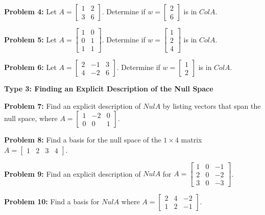 \documentclass[11pt]{article}
\begin{document}
\noindent \textbf{Problem 4:} Let $A = \begin{bmatrix} 1 & 2 \\ 3 & 6 \end{bmatrix}$. Determine if $w = \begin{bmatrix} 2 \\ 6 \end{bmatrix}$ is in $Col A$.

\noindent \textbf{Problem 5:} Let $A = \begin{bmatrix} 1 & 0 \\ 0 & 1 \\ 1 & 1 \end{bmatrix}$. Determine if $w = \begin{bmatrix} 1 \\ 2 \\ 4 \end{bmatrix}$ is in $Col A$.

\noindent \textbf{Problem 6:} Let $A = \begin{bmatrix} 2 & -1 & 3 \\ 4 & -2 & 6 \end{bmatrix}$. Determine if $w = \begin{bmatrix} 1 \\ 2 \end{bmatrix}$ is in $Col A$.

\vspace{0.5cm}
\noindent \textbf{Type 3: Finding an Explicit Description of the Null Space}

\noindent \textbf{Problem 7:} Find an explicit description of $Nul A$ by listing vectors that span the null space, where $A = \begin{bmatrix} 1 & -2 & 0 \\ 0 & 0 & 1 \end{bmatrix}$.

\noindent \textbf{Problem 8:} Find a basis for the null space of the $1 \times 4$ matrix $A = \begin{bmatrix} 1 & 2 & 3 & 4 \end{bmatrix}$.

\noindent \textbf{Problem 9:} Find an explicit description of $Nul A$ for $A = \begin{bmatrix} 1 & 0 & -1 \\ 2 & 0 & -2 \\ 3 & 0 & -3 \end{bmatrix}$.

\noindent \textbf{Problem 10:} Find a basis for $Nul A$ where $A = \begin{bmatrix} 2 & 4 & -2 \\ 1 & 2 & -1 \end{bmatrix}$.
\end{document}
